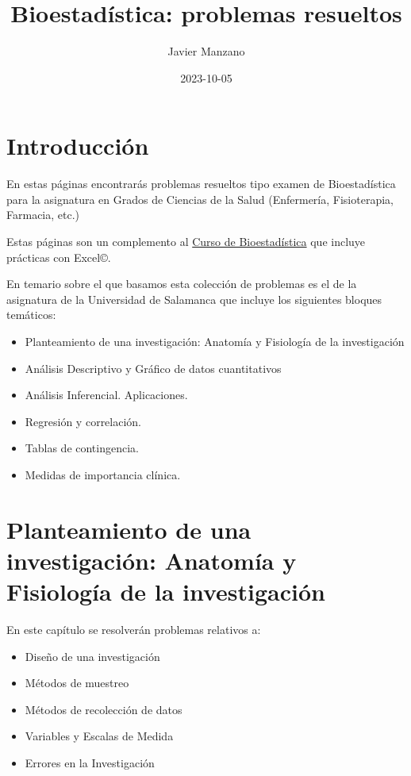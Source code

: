 \documentclass[
]{book}
\title{Bioestadística: problemas resueltos}
\author{Javier Manzano}
\date{2023-10-05}
\providecommand{\tightlist}{%
  \setlength{\itemsep}{0pt}\setlength{\parskip}{0pt}}
\begin{document}
\maketitle

{
\setcounter{tocdepth}{1}
\tableofcontents
}
\hypertarget{introducciuxf3n}{%
\chapter{Introducción}\label{introducciuxf3n}}

En estas páginas encontrarás problemas resueltos tipo examen de Bioestadística para la asignatura en Grados de Ciencias de la Salud (Enfermería, Fisioterapia, Farmacia, etc.)

Estas páginas son un complemento al \href{https://1fjmanzano.github.io/bioestadistica/}{Curso de Bioestadística} que incluye prácticas con Excel©.

En temario sobre el que basamos esta colección de problemas es el de la asignatura de la Universidad de Salamanca que incluye los siguientes bloques temáticos:

\begin{itemize}
\item
  Planteamiento de una investigación: Anatomía y Fisiología de la investigación
\item
  Análisis Descriptivo y Gráfico de datos cuantitativos
\item
  Análisis Inferencial. Aplicaciones.
\item
  Regresión y correlación.
\item
  Tablas de contingencia.
\item
  Medidas de importancia clínica.
\end{itemize}

\hypertarget{planteamiento-de-una-investigaciuxf3n-anatomuxeda-y-fisiologuxeda-de-la-investigaciuxf3n}{%
\chapter{Planteamiento de una investigación: Anatomía y Fisiología de la investigación}\label{planteamiento-de-una-investigaciuxf3n-anatomuxeda-y-fisiologuxeda-de-la-investigaciuxf3n}}

En este capítulo se resolverán problemas relativos a:

\begin{itemize}
\tightlist
\item
  Diseño de una investigación
\item
  Métodos de muestreo
\item
  Métodos de recolección de datos
\item
  Variables y Escalas de Medida
\item
  Errores en la Investigación
\end{itemize}
\end{document}
